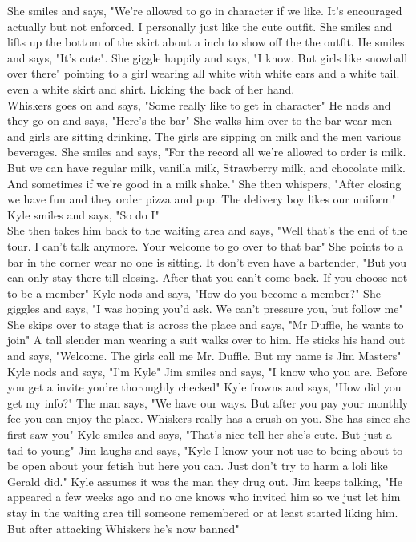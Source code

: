 \documentclass {article}[12pt]
\begin{document}
She smiles and says, "We're allowed to go in character if we like. It's encouraged actually but not enforced. I personally just like the cute outfit. She smiles and lifts up the bottom of the skirt about a inch to show off the the outfit. He smiles and says, "It's cute". She giggle happily and says, "I know. But girls like snowball over there" pointing to a girl wearing all white with white ears and a white tail. even a white skirt and shirt. Licking the back of her hand. \\

Whiskers goes on and says, "Some really like to get in character" He nods and they go on and says, "Here's the bar" She walks him over to the bar wear men and girls are sitting drinking.  The girls are sipping on milk and the men various beverages. She smiles and says, "For the record all we're allowed to order is milk. But we can have regular milk, vanilla milk, Strawberry milk, and chocolate milk. And sometimes if we're good in a milk shake." She then whispers, "After closing we have fun and they order pizza and pop. The delivery boy likes our uniform" Kyle smiles and says, "So do I"\\

She then takes him back to the waiting area and says, "Well that's the end of the tour. I can't talk anymore. Your welcome to go over to that bar" She points to a bar in the corner wear no one is sitting. It don't even have a bartender, "But you can only stay there till closing. After that you can't come back. If you choose not to be a member" Kyle nods and says, "How do you become a member?" She giggles and says, "I was hoping you'd ask. We can't pressure you, but follow me" She skips over to stage that is across the place and says, "Mr Duffle, he wants to join" A tall slender man wearing a suit walks over to him. He sticks his hand out and says, "Welcome. The girls call me Mr. Duffle. But my name is Jim Masters" Kyle nods and says, "I'm Kyle" Jim smiles and says, "I know who you are. Before you get a invite you're thoroughly checked" Kyle frowns and says, "How did you get my info?" The man says, "We have our ways. But after you pay your monthly fee you can enjoy the place. Whiskers really has a crush on you. She has since she first saw you" Kyle smiles and says, "That's nice tell her she's cute. But just a tad to young" Jim laughs and says, "Kyle I know your not use to being about to be open about your fetish but here you can. Just don't try to harm a loli like Gerald did." Kyle assumes it was the man they drug out. Jim keeps talking, "He appeared a few weeks ago and no one knows who invited him so we just let him stay in the waiting area till someone remembered or at least started liking him. But after attacking Whiskers he's now banned"\\
\end{document}

